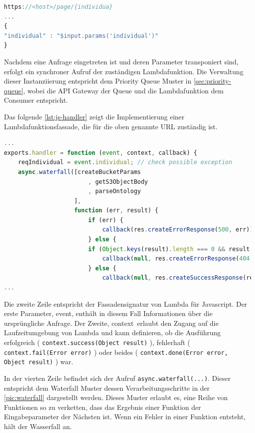 \documentclass[
12pt,
english,
ngerman,
headsepline,
twoside,
openright,
numbers=noenddot,version=first
]{scrreprt}
\begin{document}
\begin{lstlisting}[language=Javascript,caption={API Gateway Request Mapping Template},label={lst:map-template}]
https://<host>/page/{individua}
...
{
"individual" : "$input.params('individual')"
}
\end{lstlisting}

Nachdem eine Anfrage eingetreten ist und deren Parameter transponiert sind, erfolgt ein synchroner Aufruf der zuständigen Lambdafunktion. Die Verwaltung dieser Instanziierung entspricht dem Priority Queue Muster in  \autoref{sec:priority-queue}, wobei die \acrshort{API} Gateway der Queue und die Lambdafunktion dem Consumer entspricht.

Das folgende \autoref{lst:js-handler} zeigt die Implementierung einer Lambdafunktionsfassade, die für die oben genannte \acrshort{URL} zuständig ist. 

\begin{lstlisting}[language=Javascript,caption={Lambda Javascript Funktionsfassade},label={lst:js-handler}]
...
exports.handler = function (event, context, callback) {
	reqIndividual = event.individual; // check possible exception
	async.waterfall([createBucketParams
						, getS3ObjectBody
						, parseOntology
					],
					function (err, result) {
						if (err) {
							callback(res.createErrorResponse(500, err));
						} else {
						if (Object.keys(result).length === 0 && result.constructor === Object) {
							callback(null, res.createErrorResponse(404, "there was no result on the search"));
						} else {
							callback(null, res.createSuccessResponse(result));
...
\end{lstlisting}

Die zweite Zeile entspricht der Fassadensignatur von Lambda für Javascript. Der erste Parameter, \glqq event\grqq, enthält in diesem Fall Informationen über die ursprüngliche Anfrage. Der Zweite, \glqq context\grqq\, erlaubt den Zugang auf die Laufzeitumgebung von Lambda und kann definieren, ob die Ausführung erfolgreich ( \lstinline|context.success(Object result)| ), fehlerhaft ( \lstinline|context.fail(Error error)| ) oder beides ( \lstinline|context.done(Error error, Object result)| ) war. 

In der vierten Zeile befindet sich der Aufruf \lstinline|async.waterfall(...)|. Dieser entspricht dem Waterfall Muster dessen Verarbeitungsschritte in der  \autoref{pic:waterfall} dargestellt werden. 
Dieses Muster erlaubt es, eine Reihe von Funktionen so zu verketten, dass das Ergebnis einer Funktion der Eingabeparameter der Nächsten ist. Wenn ein Fehler in einer Funktion entsteht, hält der Wasserfall an. 
\end{document}
